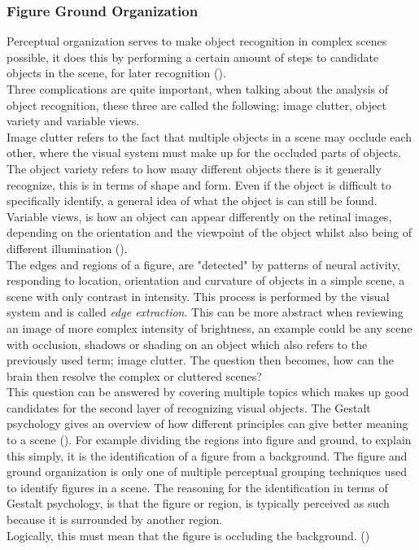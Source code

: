 \documentclass{article}
\newcommand{\goodcite}[1]{ {(\cite{#1})}}
\begin{document}
\subsubsection{Figure Ground Organization}
\label{sec:perceptialorganization}
Perceptual organization serves to make object recognition in complex scenes possible, it does this by performing a certain amount of steps to candidate objects in the scene, for later recognition\goodcite{hsp}.\\
Three complications are quite important, when talking about the analysis of object recognition, these three are called the following; image clutter, object variety and variable views.\\
Image clutter refers to the fact that multiple objects in a scene may occlude each other, where the visual system must make up for the occluded parts of objects. The object variety refers to how many different objects there is it generally recognize, this is in terms of shape and form. Even if the object is difficult to specifically identify, a general idea of what the object is can still be found. Variable views, is how an object can appear differently on the retinal images, depending on the orientation and the viewpoint of the object whilst also being of different illumination\goodcite{hsp}.\\

The edges and regions of a figure, are "detected" by patterns of neural activity, responding to location, orientation and curvature of objects in a simple scene, a scene with only contrast in intensity. This process is performed by the visual system and is called \textit{edge extraction}. This can be more abstract when reviewing an image of more complex intensity of brightness, an example could be any scene with occlusion, shadows or shading on an object which also refers to the previously used term; image clutter. The question then becomes, how can the brain then resolve the complex or cluttered scenes?\\

This question can be answered by covering multiple topics which makes up good candidates for the second layer of recognizing visual objects. The Gestalt psychology gives an overview of how different principles can give better meaning to a scene\goodcite{hsp}. For example dividing the regions into figure and ground, to explain this simply, it is the identification of a figure from a background. The figure and ground organization is only one of multiple perceptual grouping techniques used to identify figures in a scene. The reasoning for the identification in terms of Gestalt psychology, is that the figure or region, is typically perceived as such because it is surrounded by another region.\\Logically, this must mean that the figure is occluding the background.\goodcite{hsp}\\
\end{document}
